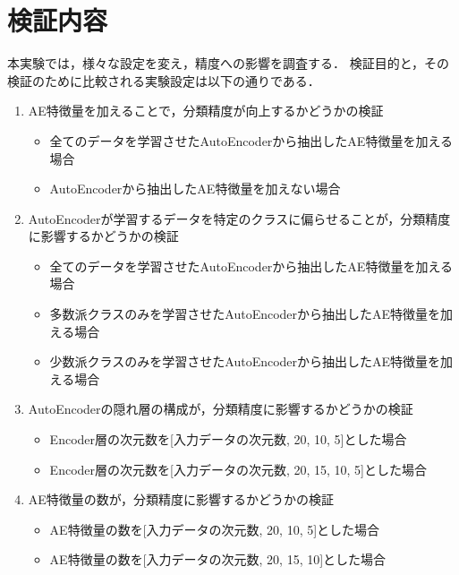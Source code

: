 \section{検証内容}
本実験では，様々な設定を変え，精度への影響を調査する．
検証目的と，その検証のために比較される実験設定は以下の通りである．

\begin{enumerate}
    \item AE特徴量を加えることで，分類精度が向上するかどうかの検証
    \begin{itemize}
        \item 全てのデータを学習させたAutoEncoderから抽出したAE特徴量を加える場合
        \item AutoEncoderから抽出したAE特徴量を加えない場合
    \end{itemize}

    \item AutoEncoderが学習するデータを特定のクラスに偏らせることが，分類精度に影響するかどうかの検証
    \begin{itemize}
        \item 全てのデータを学習させたAutoEncoderから抽出したAE特徴量を加える場合
        \item 多数派クラスのみを学習させたAutoEncoderから抽出したAE特徴量を加える場合
        \item 少数派クラスのみを学習させたAutoEncoderから抽出したAE特徴量を加える場合
    \end{itemize}

    \item AutoEncoderの隠れ層の構成が，分類精度に影響するかどうかの検証
    \begin{itemize}
        \item Encoder層の次元数を[入力データの次元数, 20, 10, 5]とした場合
        \item Encoder層の次元数を[入力データの次元数, 20, 15, 10, 5]とした場合
    \end{itemize}

    \item AE特徴量の数が，分類精度に影響するかどうかの検証
    \begin{itemize}
        \item AE特徴量の数を[入力データの次元数, 20, 10, 5]とした場合
        \item AE特徴量の数を[入力データの次元数, 20, 15, 10]とした場合
    \end{itemize}


\end{enumerate}
